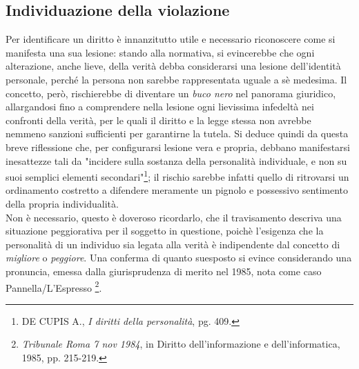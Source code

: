 \subsection{Individuazione della violazione}
Per identificare un diritto è innanzitutto utile e necessario riconoscere come si manifesta una sua lesione: stando alla normativa, si evincerebbe che ogni alterazione, anche lieve, della verità debba considerarsi una lesione dell'identità personale, perché la persona non sarebbe rappresentata uguale a sè medesima. Il concetto, però, rischierebbe di diventare un \textit{buco nero} nel panorama giuridico, allargandosi fino a comprendere nella lesione ogni lievissima infedeltà nei confronti della verità, per le quali il diritto e la legge stessa non avrebbe nemmeno sanzioni sufficienti per garantirne la tutela. Si deduce quindi da questa breve riflessione che, per configurarsi lesione vera e propria, debbano manifestarsi inesattezze tali da "incidere sulla sostanza della personalità individuale, e non su suoi semplici elementi secondari"\footnote{DE CUPIS A., \textit{I diritti della personalità}, pg. 409.}; il rischio sarebbe infatti quello di ritrovarsi un ordinamento costretto a difendere meramente un pignolo e possessivo sentimento della propria individualità.
\\Non è necessario, questo è doveroso ricordarlo, che il travisamento descriva una situazione peggiorativa per il soggetto in questione, poichè l'esigenza che la personalità di un individuo sia legata alla verità è indipendente dal concetto di \textit{migliore} o \textit{peggiore}.
Una conferma di quanto suesposto si evince considerando una pronuncia, emessa dalla giurisprudenza di merito nel 1985, nota come caso Pannella/L'Espresso \footnote{\textit{Tribunale Roma 7 nov 1984}, in Diritto dell’informazione e dell’informatica, 1985, pp. 215-219.}.
